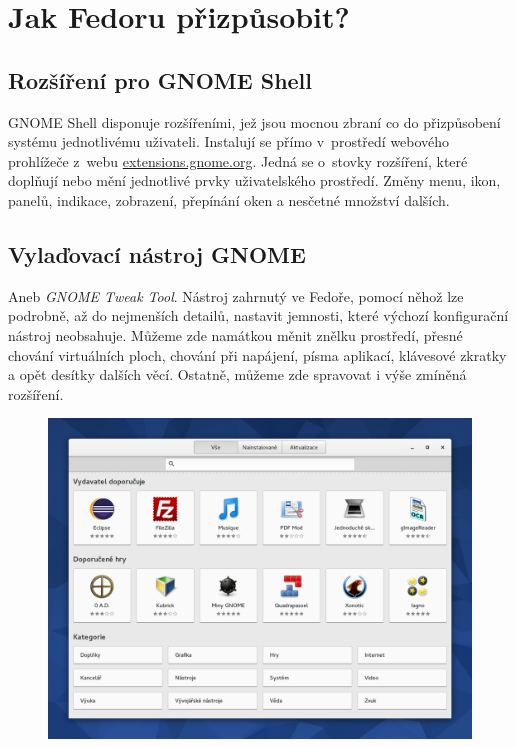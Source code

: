 \chapter*{Jak Fedoru přizpůsobit?}

\section*{Rozšíření pro GNOME Shell}
GNOME Shell disponuje rozšířeními, jež jsou mocnou zbraní co do přizpůsobení systému jednotlivému uživateli. Instalují se přímo v~prostředí webového prohlížeče z~webu \url{extensions.gnome.org}. Jedná se o~stovky rozšíření, které doplňují nebo mění jednotlivé prvky uživatelského prostředí. Změny menu, ikon, panelů, indikace, zobrazení, přepínání oken a nesčetné množství dalších.

\section*{Vylaďovací nástroj GNOME}
Aneb \emph{GNOME Tweak Tool}. Nástroj zahrnutý ve Fedoře, pomocí něhož lze podrobně, až do nejmenších detailů, nastavit jemnosti, které výchozí konfigurační nástroj neobsahuje. Můžeme zde namátkou měnit znělku prostředí, přesné chování virtuálních ploch, chování při napájení, písma aplikací, klávesové zkratky a opět desítky dalších věcí. Ostatně, můžeme zde spravovat i výše zmíněná rozšíření.

\begin{figure}[t]
\begin{center}
\includegraphics[width=\textwidth]{img/software}
 \label{fig:software}
\end{center}
\end{figure}
